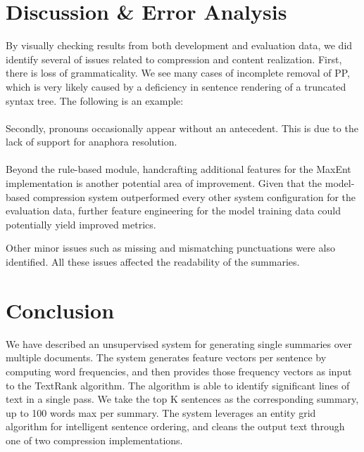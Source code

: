 \documentclass[11pt]{article}
\begin{document}
\section{Discussion \& Error Analysis}

By visually checking results from both development and evaluation data, we did identify several of issues related to compression and content realization. First, there is loss of grammaticality. We see many cases of incomplete removal of PP, which is very likely caused by a deficiency in sentence rendering of a truncated syntax tree. The following is an example:
\\

\\ 

Secondly, pronouns occasionally appear without an antecedent. This is due to the lack of support for anaphora resolution. 
\\

\\

Beyond the rule-based module, handcrafting additional features for the MaxEnt implementation is another potential area of improvement. Given that the model-based compression system outperformed every other system configuration for the evaluation data, further feature engineering for the model training data could potentially yield improved metrics.

Other minor issues such as missing and mismatching punctuations were also identified. All these issues affected the readability of the summaries.


\section{Conclusion}
 We have described an unsupervised system for generating single summaries over multiple documents. The system generates feature vectors per sentence by computing word frequencies, and then provides those frequency vectors as input to the TextRank algorithm. The algorithm is able to identify significant lines of text in a single pass. We take the top K sentences as the corresponding summary, up to 100 words max per summary. The system leverages an entity grid algorithm for intelligent sentence ordering, and cleans the output text through one of two compression implementations.
\end{document}
